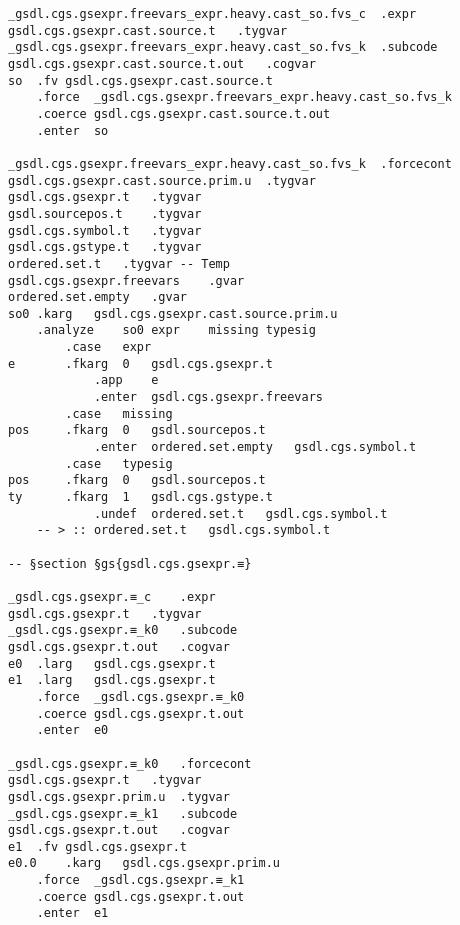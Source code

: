 \documentclass{report}
\begin{document}
\begin{verbatim}
_gsdl.cgs.gsexpr.freevars_expr.heavy.cast_so.fvs_c	.expr
gsdl.cgs.gsexpr.cast.source.t	.tygvar
_gsdl.cgs.gsexpr.freevars_expr.heavy.cast_so.fvs_k	.subcode
gsdl.cgs.gsexpr.cast.source.t.out	.cogvar
so	.fv	gsdl.cgs.gsexpr.cast.source.t
	.force	_gsdl.cgs.gsexpr.freevars_expr.heavy.cast_so.fvs_k
	.coerce	gsdl.cgs.gsexpr.cast.source.t.out
	.enter	so

_gsdl.cgs.gsexpr.freevars_expr.heavy.cast_so.fvs_k	.forcecont
gsdl.cgs.gsexpr.cast.source.prim.u	.tygvar
gsdl.cgs.gsexpr.t	.tygvar
gsdl.sourcepos.t	.tygvar
gsdl.cgs.symbol.t	.tygvar
gsdl.cgs.gstype.t	.tygvar
ordered.set.t	.tygvar	-- Temp
gsdl.cgs.gsexpr.freevars	.gvar
ordered.set.empty	.gvar
so0	.karg	gsdl.cgs.gsexpr.cast.source.prim.u
	.analyze	so0	expr	missing	typesig
		.case	expr
e		.fkarg	0	gsdl.cgs.gsexpr.t
			.app	e
			.enter	gsdl.cgs.gsexpr.freevars
		.case	missing
pos		.fkarg	0	gsdl.sourcepos.t
			.enter	ordered.set.empty	gsdl.cgs.symbol.t
		.case	typesig
pos		.fkarg	0	gsdl.sourcepos.t
ty		.fkarg	1	gsdl.cgs.gstype.t
			.undef	ordered.set.t	gsdl.cgs.symbol.t
	-- > :: ordered.set.t	gsdl.cgs.symbol.t

-- §section §gs{gsdl.cgs.gsexpr.≡}

_gsdl.cgs.gsexpr.≡_c	.expr
gsdl.cgs.gsexpr.t	.tygvar
_gsdl.cgs.gsexpr.≡_k0	.subcode
gsdl.cgs.gsexpr.t.out	.cogvar
e0	.larg	gsdl.cgs.gsexpr.t
e1	.larg	gsdl.cgs.gsexpr.t
	.force	_gsdl.cgs.gsexpr.≡_k0
	.coerce	gsdl.cgs.gsexpr.t.out
	.enter	e0

_gsdl.cgs.gsexpr.≡_k0	.forcecont
gsdl.cgs.gsexpr.t	.tygvar
gsdl.cgs.gsexpr.prim.u	.tygvar
_gsdl.cgs.gsexpr.≡_k1	.subcode
gsdl.cgs.gsexpr.t.out	.cogvar
e1	.fv	gsdl.cgs.gsexpr.t
e0.0	.karg	gsdl.cgs.gsexpr.prim.u
	.force	_gsdl.cgs.gsexpr.≡_k1
	.coerce	gsdl.cgs.gsexpr.t.out
	.enter	e1


\end{verbatim}
\end{document}
